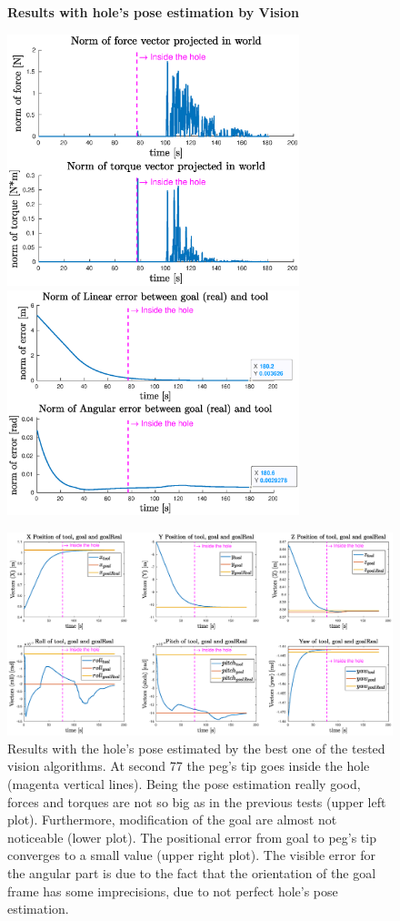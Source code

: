 \begin{figure}[H]
	\centering
	\textbf{Results with hole's pose estimation by Vision}\\
	\vspace*{20px}
	\centerline{
		\includegraphics[width=8.5cm]{withVisio/forceNorm.eps}
		\includegraphics[width=8.5cm]{withVisio/errorNorm.eps}
	}
	\vspace{30px}
	\centerline{
		\includegraphics[width=19.5cm]{withVisio/6_error.eps}
	}
	\vspace{10px}
	\caption[Plots of results with Hole's pose estimation by Vision]{Results with the hole's pose estimated by the best one of the tested vision algorithms. At second 77 the peg's tip goes inside the hole (magenta vertical lines). Being the pose estimation really good, forces and torques are not so big  as in the previous tests (upper left plot). Furthermore, modification of the goal are almost not noticeable (lower plot). The positional error from goal to peg's tip  converges to a small value (upper right plot). The visible error for the angular part is due to the fact that the orientation of the goal frame has some imprecisions, due to not perfect hole's pose estimation.}
	\label{fig:expWithVisio}
\end{figure}

